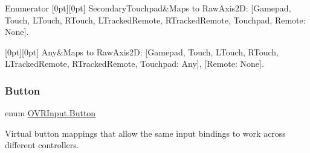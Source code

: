 \begin{DoxyEnumFields}{Enumerator}
[0pt][0pt]{}\mbox{\label{class_o_v_r_input_a8d8de8321e36e4c5c3b5266b72468d8aa177ba2bf42c325826c45d82357fc9e70}} 
Secondary\+Touchpad&Maps to Raw\+Axis2D\+: \mbox{[}Gamepad, Touch, L\+Touch, R\+Touch, L\+Tracked\+Remote, R\+Tracked\+Remote, Touchpad, Remote\+: None\mbox{]}. \\
\hline

[0pt][0pt]{}\mbox{\label{class_o_v_r_input_a8d8de8321e36e4c5c3b5266b72468d8aaed36a1ef76a59ee3f15180e0441188ad}} 
Any&Maps to Raw\+Axis2D\+: \mbox{[}Gamepad, Touch, L\+Touch, R\+Touch, L\+Tracked\+Remote, R\+Tracked\+Remote, Touchpad\+: Any\mbox{]}, \mbox{[}Remote\+: None\mbox{]}. \\
\hline

\end{DoxyEnumFields}
\mbox{\label{class_o_v_r_input_aed3cf5b4b5e0669cea0941f61e018ee5}} 
\subsubsection{\texorpdfstring{Button}{Button}}
{\footnotesize\ttfamily enum \mbox{\hyperlink{class_o_v_r_input_aed3cf5b4b5e0669cea0941f61e018ee5}{O\+V\+R\+Input.\+Button}}\hspace{0.3cm}{\ttfamily [strong]}}



Virtual button mappings that allow the same input bindings to work across different controllers. 

